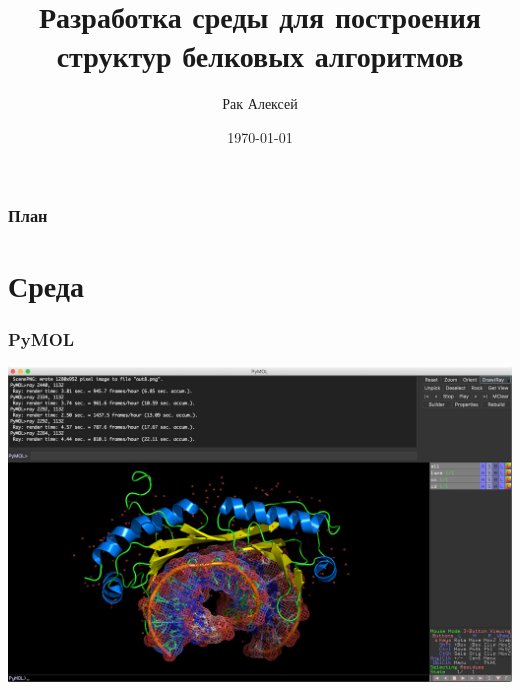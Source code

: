 \documentclass{beamer}
\title{Разработка среды для построения структур белковых алгоритмов} %
\author{Рак Алексей} %
\date{\today} %
\begin{document}
\begin{frame}
\titlepage %
\end{frame}

\begin{frame}
\frametitle{План} %
\tableofcontents %
\end{frame}

\section{ Среда}
\begin{frame}
\frametitle{PyMOL}
\includegraphics[scale=0.47]{../pictures/pic3.png}
\end{frame}
\end{document}
